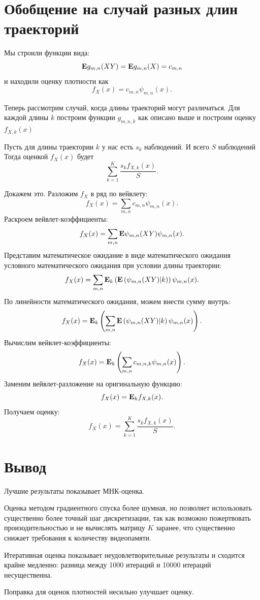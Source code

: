 \documentclass[12pt, a4paper]{report}
\begin{document}
\chapter{Обобщение на случай разных длин траекторий}
Мы строили функции вида:
\[
  \mathbf{E} g_{m,n}(XY) = \mathbf{E} g_{m,n}(X) = c_{m,n}
\] и находили оценку плотности как
\[
  f_X(x) = c_{m,n} \psi_{m,n}(x)
.\]

Теперь рассмотрим случай, когда длины траекторий могут различаться.
Для каждой длины $k$ построим функции $g_{m,n,k}$ как описано выше
и построим оценку $f_{X,k}(x)$

Пусть для длины траектории $k$ у нас есть $s_k$ наблюдений. И всего $S$ наблюдений
Тогда оценкой $f_X(x)$ будет
\[
  \sum_{k=1}^K \frac{s_k f_{X,k}(x)}{S}
.\]

Докажем это. Разложим $f_X$ в ряд по вейвлету:
\[
  f_X(x) = \sum_{m,n} c_{m,n} \psi_{m,n}(x).
\]
Раскроем вейвлет-коэффициенты:
\[
  f_X(x) = \sum_{m,n} \mathbf{E} \psi_{m,n}(XY) \psi_{m,n}(x).
\]
Представим математическое ожидание в виде математического ожидания условного математического ожидания при условии длины траектории:
\[
  f_X(x) = \sum_{m,n} \mathbf{E}_k \left(\mathbf{E} \left(\psi_{m,n}(XY) | k \right) \right ) \psi_{m,n}(x).
\]
По линейности математического ожидания, можем внести сумму внутрь:
\[
  f_X(x) = \mathbf{E}_k \left( \sum_{m,n} \mathbf{E} \left(\psi_{m,n}(XY) | k \right) \psi_{m,n}(x) \right).
\]
Вычислим вейвлет-коэффициенты:
\[
  f_X(x) = \mathbf{E}_k \left(\sum_{m,n} c_{m,n,k} \psi_{m,n}(x) \right).
\]
Заменим вейвлет-разложение на оригинальную функцию:
\[
  f_X(x) = \mathbf{E}_k f_{X,k}(x).
\]
Получаем оценку:
\[
  f_X(x) = \sum_{k=1}^K \frac{s_k f_{X,k}(x)}{S}.
\]

\chapter{Вывод}
Лучшие результаты показывает МНК-оценка.

Оценка методом градиентного спуска более шумная, но позволяет использовать
существенно более точный шаг дискретизации, так как возможно пожертвовать
произодительностью и не вычислять матрицу $K$ заранее, что существенно снижает
требования к количеству видеопамяти. 

Итеративная оценка показывает неудовлетворительные результаты и сходится крайне
медленно: разница между 1000 итераций и 10000 итераций несущественна.

Поправка для оценок плотностей несильно улучшает оценку.

%
\printbibliography
\end{document}
